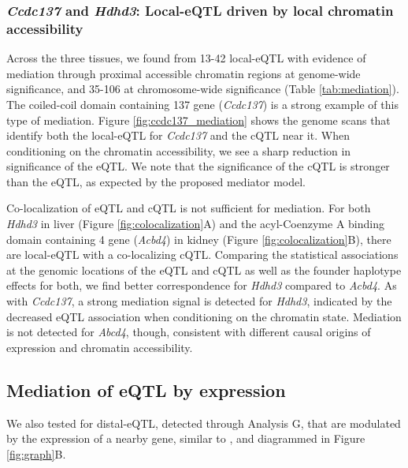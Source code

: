 \documentclass[9pt,twocolumn,twoside]{gsajnl}
\begin{document}
\subsubsection{\textit{Ccdc137} and \textit{Hdhd3}: Local-eQTL driven by local chromatin accessibility}
Across the three tissues, we found from 13-42 local-eQTL with evidence of mediation through proximal accessible chromatin regions at genome-wide significance, and 35-106 at chromosome-wide significance (Table \ref{tab:mediation}). The coiled-coil domain containing 137 gene (\textit{Ccdc137}) is a strong example of this type of mediation. Figure \ref{fig:ccdc137_mediation} shows the genome scans that identify both the local-eQTL for \textit{Ccdc137} and the cQTL near it. 
When conditioning on the chromatin accessibility, we see a sharp reduction in significance of the eQTL. We note that the significance of the cQTL is stronger than the eQTL, as expected by the proposed mediator model. 

Co-localization of eQTL and cQTL is not sufficient for mediation. For both \textit{Hdhd3} in liver (Figure \ref{fig:colocalization}A) and the acyl-Coenzyme A binding domain containing 4 gene (\textit{Acbd4}) in kidney (Figure \ref{fig:colocalization}B), there are local-eQTL with a co-localizing cQTL. Comparing the statistical associations at the genomic locations of the eQTL and cQTL as well as the founder haplotype effects for both, we find better correspondence for \textit{Hdhd3} compared to \textit{Acbd4}. As with \textit{Ccdc137}, a strong mediation signal is detected for \textit{Hdhd3}, indicated by the decreased eQTL association when conditioning on the chromatin state. Mediation is not detected for \textit{Abcd4}, though, consistent with different causal origins of expression and chromatin accessibility.

\subsection{Mediation of eQTL by expression} 

We also tested for distal-eQTL, detected through Analysis G, that are modulated by the expression of a nearby gene, similar to \cite{Keller2018}, and diagrammed in Figure \ref{fig:graph}B. 
\end{document}
